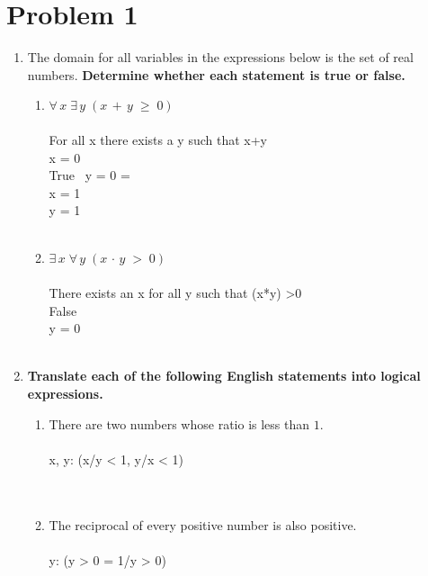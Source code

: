 \section*{Problem 1}
\begin{enumerate}[label=(\alph*)]
\item The domain for all variables in the expressions below is the set of real numbers. {\bf Determine whether each statement is true or false.}
\begin{enumerate}[label=(\roman*)]
  \item $\forall\, x\; \exists \,y\;(x\,+\,y\;\geq \;0)$
\\\\
  For all x there exists a y such that x+y\;\geq {} \\
  x = 0 \\
  True \ y = 0 = \  \\
  x = 1 \\
  y = 1 
\\\\
  \item $\exists \, x\; \forall \,y\;(x\,\cdot\,y\;>\; 0)$
   \\\\
  There exists an x for all y such that (x*y) \textgreater 0 \\
  False \\
  y = 0
\\\\
\end{enumerate}

\item {\bf Translate each of the following English statements into logical expressions.}
\begin{enumerate}[label=(\roman*)]
  \item There are two numbers whose ratio is less than $1$.
   \\\\
  \exists x, y: (x/y < 1, y/x < 1) \\

\\\\
  \item The reciprocal of every positive number is also positive.
   \\\\
  \forall y: (y > 0 = 1/y > 0)
\\\\
  \end{enumerate}
  \end{enumerate}
  \newpage
